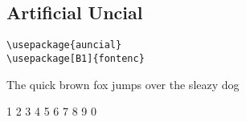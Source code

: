 \documentclass[a4paper]{article}
\newcommand{\frase}{The quick brown fox jumps over the sleazy dog}
\begin{document}
\subsection*{Artificial Uncial}

\begin{verbatim}
\usepackage{auncial}
\usepackage[B1]{fontenc}
\end{verbatim}

{\normalfont\aunclfamily \frase

1 2 3 4 5 6 7 8 9 0}
\end{document}
